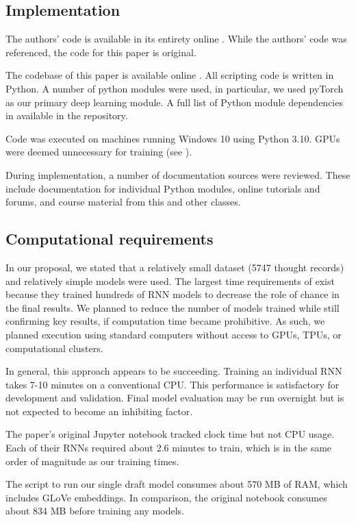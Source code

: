 \documentclass[11pt,a4paper]{article}
\begin{document}
\subsection{Implementation}
The authors' code is available in its entirety online \citep{burger_2021_data}. While the authors' code was referenced, the code for this paper is original. 

The codebase of this paper is available online \citep{cs598_repo}. All scripting code is written in Python. A number of python modules were used, in particular, we used pyTorch as our primary deep learning module. A full list of Python module dependencies in available in the repository. 

Code was executed on machines running Windows 10 using Python 3.10. GPUs were deemed unnecessary for training (see ). 

During implementation, a number of documentation sources were reviewed. These include documentation for individual Python modules, online tutorials and forums, and course material from this and other classes.  

\subsection{Computational requirements}
\label{comp_reqs}

In our proposal, we stated that a relatively small dataset (5747 thought records) and relatively simple models were used. 
The largest time requirements of \citet{burger_2021} exist because they trained hundreds of RNN models to decrease the role of chance in the final results. We planned to reduce the number of models trained while still confirming key results, if computation time became prohibitive. As such, we planned execution using standard computers without access to GPUs, TPUs, or computational clusters. 

In general, this approach appears to be succeeding. Training an individual RNN takes 7-10 minutes on a conventional CPU. This performance is satisfactory for development and validation. Final model evaluation may be run overnight but is not expected to become an inhibiting factor. 

The paper's original Jupyter notebook tracked clock time but not CPU usage. Each of their RNNs required about 2.6 minutes to train, which is in the same order of magnitude as our training times.

The script to run our single draft model consumes about 570 MB of RAM, which includes GLoVe embeddings. In comparison, the original notebook consumes about 834 MB before training any models.
\end{document}

